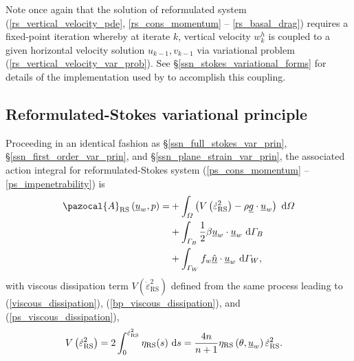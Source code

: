 Note once again that the solution of reformulated system (\ref{rs_vertical_velocity_pde}, \ref{rs_cons_momentum} -- \ref{rs_basal_drag}) requires a fixed-point iteration whereby at iterate $k$, vertical velocity $w_k^h$ is coupled to a given horizontal velocity solution $u_{k-1},v_{k-1}$ via variational problem (\ref{rs_vertical_velocity_var_prob}).  See \S \ref{ssn_stokes_variational_forms} for details of the implementation used by \CSLVR to accomplish this coupling.

\subsection{Reformulated-Stokes variational principle} \label{ssn_reformulated_stokes_var_prin}

Proceeding in an identical fashion as \S \ref{ssn_full_stokes_var_prin}, \S \ref{ssn_first_order_var_prin}, and \S \ref{ssn_plane_strain_var_prin}, the associated action integral for reformulated-Stokes system (\ref{ps_cons_momentum} -- \ref{ps_impenetrability}) is
\begin{align}
  \label{rs_action_intermediate}
  \pazocal{A}_{\text{RS}} \left(\rankone{u}_w, p\right) = &+ \int_{\Omega} \left( V\left( \dot{\varepsilon}_{\text{RS}}^2 \right) - \rho \rankone{g} \cdot \rankone{u}_w \right) \d{\Omega} \notag \\
  &+ \int_{\Gamma_B} \frac{1}{2} \beta \rankone{u}_w \cdot \rankone{u}_w \d{\Gamma_B} \notag \\
  &+ \int_{\Gamma_W} f_w \normal \cdot \rankone{u}_w \d{\Gamma_W},
\end{align}
with viscous dissipation term $V\left( \dot{\varepsilon}_{\text{RS}}^2 \right)$ defined from the same process leading to (\ref{viscous_dissipation}), (\ref{bp_viscous_dissipation}), and (\ref{ps_viscous_dissipation}), 
\begin{align}
  \label{rs_viscous_dissipation}
  V\left( \dot{\varepsilon}_{\text{RS}}^2 \right) &= 2\int_0^{\dot{\varepsilon}_{\text{RS}}^2} \eta_{\text{RS}}(s) \ \mathrm{d}s = \frac{4n}{n+1} \eta_{\text{RS}}\left(\theta, \underline{u}_w \right) \dot{\varepsilon}_{\text{RS}}^2.
\end{align}

